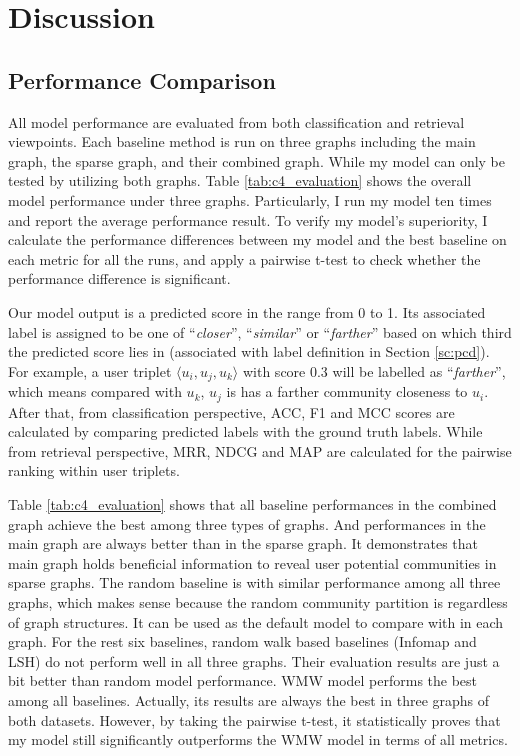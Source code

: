 \section{Discussion}
\subsection{Performance Comparison}

All model performance are evaluated from both classification and retrieval viewpoints. Each baseline method is run on three graphs including the main graph, the sparse graph, and their combined graph. While my model can only be tested by utilizing both graphs. Table \ref{tab:c4_evaluation} shows the overall model performance under three graphs. Particularly, I run my model ten times and report the average performance result. To verify my model's superiority, I calculate the performance differences between my model and the best baseline on each metric for all the runs, and apply a pairwise t-test to check whether the performance difference is significant.

Our model output is a predicted score in the range from 0 to 1. Its associated label is assigned to be one of ``\textit{closer}'', ``\textit{similar}'' or ``\textit{farther}'' based on which third the predicted score lies in (associated with label definition in Section \ref{sc:pcd}). For example, a user triplet $\langle u_i,u_j,u_k \rangle$ with score 0.3 will be labelled as ``\textit{farther}'', which means compared with $u_k$, $u_j$ is has a farther community closeness to $u_i$. After that, from classification perspective, ACC, F1 and MCC scores are calculated by comparing predicted labels with the ground truth labels. While from retrieval perspective, MRR, NDCG and MAP are calculated for the pairwise ranking within user triplets.

Table \ref{tab:c4_evaluation} shows that all baseline performances in the combined graph achieve the best among three types of graphs. And performances in the main graph are always better than in the sparse graph. It demonstrates that main graph holds beneficial information to reveal user potential communities in sparse graphs. The random baseline is with similar performance among all three graphs, which makes sense because the random community partition is regardless of graph structures. It can be used as the default model to compare with in each graph. For the rest six baselines, random walk based baselines (Infomap and LSH) do not perform well in all three graphs. Their evaluation results are just a bit better than random model performance. WMW model performs the best among all baselines. Actually, its results are always the best in three graphs of both datasets. However, by taking the pairwise t-test, it statistically proves that my model still significantly outperforms the WMW model in terms of all metrics. 

